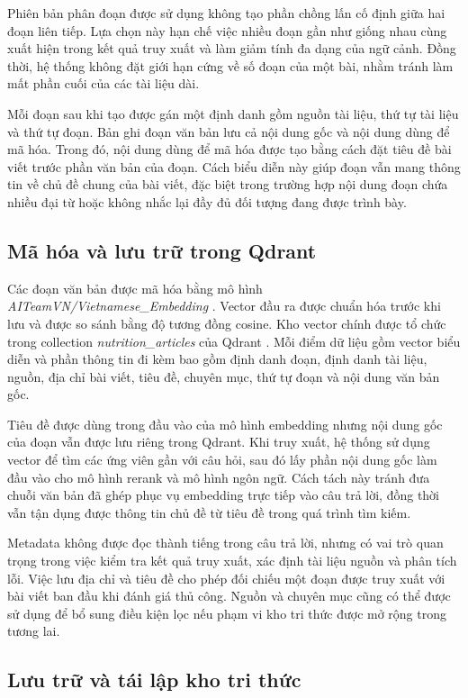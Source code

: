 \documentclass[a4paper,13pt,twoside]{report}
\begin{document}
Phiên bản phân đoạn được sử dụng không tạo phần chồng lấn cố định giữa hai đoạn liên tiếp. Lựa chọn này hạn chế việc nhiều đoạn gần như giống nhau cùng xuất hiện trong kết quả truy xuất và làm giảm tính đa dạng của ngữ cảnh. Đồng thời, hệ thống không đặt giới hạn cứng về số đoạn của một bài, nhằm tránh làm mất phần cuối của các tài liệu dài.

Mỗi đoạn sau khi tạo được gán một định danh gồm nguồn tài liệu, thứ tự tài liệu và thứ tự đoạn. Bản ghi đoạn văn bản lưu cả nội dung gốc và nội dung dùng để mã hóa. Trong đó, nội dung dùng để mã hóa được tạo bằng cách đặt tiêu đề bài viết trước phần văn bản của đoạn. Cách biểu diễn này giúp đoạn vẫn mang thông tin về chủ đề chung của bài viết, đặc biệt trong trường hợp nội dung đoạn chứa nhiều đại từ hoặc không nhắc lại đầy đủ đối tượng đang được trình bày.

\subsection{Mã hóa và lưu trữ trong Qdrant}

Các đoạn văn bản được mã hóa bằng mô hình \textit{AITeamVN/Vietnamese\_Embedding} \cite{vietembedding}. Vector đầu ra được chuẩn hóa trước khi lưu và được so sánh bằng độ tương đồng cosine. Kho vector chính được tổ chức trong collection \textit{nutrition\_articles} của Qdrant \cite{qdrant}. Mỗi điểm dữ liệu gồm vector biểu diễn và phần thông tin đi kèm bao gồm định danh đoạn, định danh tài liệu, nguồn, địa chỉ bài viết, tiêu đề, chuyên mục, thứ tự đoạn và nội dung văn bản gốc.

Tiêu đề được dùng trong đầu vào của mô hình embedding nhưng nội dung gốc của đoạn vẫn được lưu riêng trong Qdrant. Khi truy xuất, hệ thống sử dụng vector để tìm các ứng viên gần với câu hỏi, sau đó lấy phần nội dung gốc làm đầu vào cho mô hình rerank và mô hình ngôn ngữ. Cách tách này tránh đưa chuỗi văn bản đã ghép phục vụ embedding trực tiếp vào câu trả lời, đồng thời vẫn tận dụng được thông tin chủ đề từ tiêu đề trong quá trình tìm kiếm.

Metadata không được đọc thành tiếng trong câu trả lời, nhưng có vai trò quan trọng trong việc kiểm tra kết quả truy xuất, xác định tài liệu nguồn và phân tích lỗi. Việc lưu địa chỉ và tiêu đề cho phép đối chiếu một đoạn được truy xuất với bài viết ban đầu khi đánh giá thủ công. Nguồn và chuyên mục cũng có thể được sử dụng để bổ sung điều kiện lọc nếu phạm vi kho tri thức được mở rộng trong tương lai.

\subsection{Lưu trữ và tái lập kho tri thức}
\end{document}
